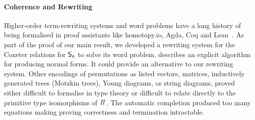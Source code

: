 
\paragraph{Coherence and Rewriting}

Higher-order term-rewriting systems and word problems have a long history of being formalised in proof assistants like
{homotopy.io}, Agda, Coq and Lean~\cite{krausCoherenceWellFoundednessTaming2020}. As part of the proof of our main
result, we developed a rewriting system for the Coxeter relations for $\Sn$ to solve its word problem. \citet{Hiver-coq}
describes an explicit algorithm for producing normal forms. It could provide an alternative to our rewriting system. Other
encodings of permutations as listed vectors, matrices, inductively generated trees (Motzkin trees), Young diagrams, or
string diagrams, proved either difficult to formalise in type theory or difficult to relate directly to the primitive type
isomorphisms of $\mathit{\Pi}$. The automatic \citet{knuthSimpleWordProblems1970} completion produced too many equations
making proving correctness and termination intractable.

